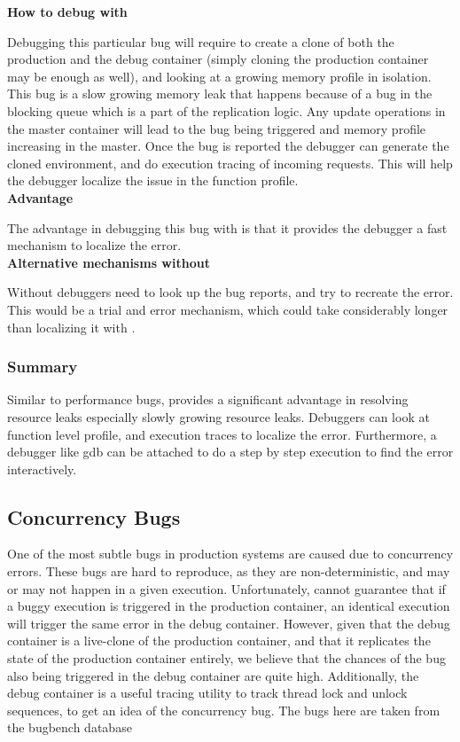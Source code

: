 \noindent \textbf{How to debug with \parikshan}

Debugging this particular bug will require to create a clone of both the production and the debug container (simply cloning the production container may be enough as well), and looking at a growing memory profile in isolation. This bug is a slow growing memory leak that happens because of a bug in the blocking queue which is a part of the replication logic. Any update operations in the master container will lead to the bug being triggered and memory profile increasing in the master. Once the bug is reported the debugger can generate the cloned environment, and do execution tracing of incoming requests. This will help the debugger localize the issue in the function profile. \\

\noindent \textbf{Advantage}

The advantage in debugging this bug with \parikshan is that it provides the debugger a fast mechanism to localize the error.\\

\noindent \textbf{Alternative mechanisms without \parikshan}

Without \parikshan debuggers need to look up the bug reports, and try to recreate the error. This would be a trial and error mechanism, which could take considerably longer than localizing it with \parikshan.

\subsubsection{Summary}

Similar to performance bugs, \parikshan provides a significant advantage in resolving resource leaks especially slowly growing resource leaks. Debuggers can look at function level profile, and execution traces to localize the error. Furthermore, a debugger like gdb can be attached  to do a step by step execution to find the error interactively. 

\subsection{Concurrency Bugs}
One of the most subtle bugs in production systems are caused due to concurrency errors.
These bugs are hard to reproduce, as they are non-deterministic, and may or may not happen in a given execution.
Unfortunately, \parikshan cannot guarantee that if a buggy execution is triggered in the production container, an identical execution will trigger the same error in the debug container.
However, given that the debug container is a live-clone of the production container, and that it replicates the state of the production container entirely, we believe that the chances of the bug also being triggered in the debug container are quite high.
Additionally, the debug container is a useful tracing utility to track thread lock and unlock sequences, to get an idea of the concurrency bug.
The bugs here are taken from the bugbench database~\cite{bugbench}

